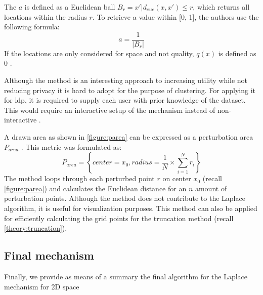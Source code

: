 The $a$ is defined as a Euclidean ball $B_r = {x' | d_{euc}(x, x') \leq r}$, which returns all locations within the radius $r$.
To retrieve a value within [0, 1], the authors use the following formula:
\begin{equation}
  a = \frac{1}{|B_r|}
  \label{equation:privacy-mass-a}
\end{equation}
If the locations are only considered for space and not quality, $q(x)$ is defined as 0 \citep{chatzikokolakis_constructing_2015}. \newline

Although the method is an interesting approach to increasing utility while not reducing privacy it is hard to adopt for the purpose of clustering.
For applying it for \gls{ldp}, it is required to supply each user with prior knowledge of the dataset.
This would require an interactive setup of the mechanism instead of non-interactive . \newline

A drawn area as shown in \ref{figure:parea} can be expressed as a perturbation area $P_{area}$ \citep{yan_perturb_2022-2}.
This metric was formulated as:
\begin{equation}
  P_{area}=\left\{ center = x_{0},radius = \frac{1}{N}\times \sum _{i=1}^{N}r_{i}\right\}
\end{equation}
The method loops through each perturbed point $r$ on center $x_0$ (recall \ref{figure:parea}) and calculates the Euclidean distance for an $n$ amount of perturbation points.
Although the method does not contribute to the Laplace algorithm, it is useful for visualization purposes.
This method can also be applied for efficiently calculating the grid points for the truncation method (recall \ref{theory:truncation}).
\newpage
\subsection{Final mechanism}
Finally, we provide as means of a summary the final algorithm for the Laplace mechanism for 2D space

\newpage